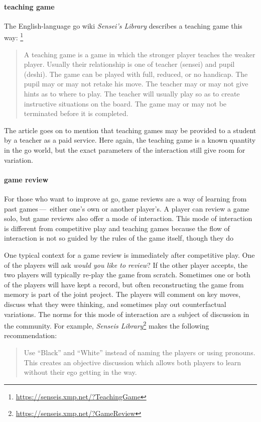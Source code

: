 \documentclass{scrartcl}
\begin{document}
\paragraph{teaching game} The English-language go wiki 
\textit{Sensei's Library}
describes a teaching game this way:%
\footnote{\url{https://senseis.xmp.net/?TeachingGame}}
\begin{quote}
  A teaching game is a game in which the stronger player teaches the weaker player. Usually their relationship is one of teacher (sensei) and pupil (deshi). The game can be played with full, reduced, or no handicap. The pupil may or may not retake his move. The teacher may or may not give hints as to where to play. The teacher will usually play so as to create instructive situations on the board. The game may or may not be terminated before it is completed. 
\end{quote}

\noindent The article goes on to mention that teaching games may
be provided to a student by a teacher as a paid service.
Here again, the teaching game is a known quantity in the go world,
but the exact parameters of the interaction still 
give room for variation. 

\paragraph{game review} For those who want to improve at go,
game reviews are a way of learning from past games\,---\,%
either one's own or another player's.
A player can review a game solo, 
but game reviews also offer a mode of interaction.
This mode of interaction is different from competitive play and
teaching games because the flow of interaction is not so guided
by the rules of the game itself, though they do 

One typical context for a game review is immediately after 
competitive play. 
One of the players will ask \textit{would you like to review}?
If the other player accepts, 
the two players will typically re-play the game from scratch.
Sometimes one or both of the players will have kept a record,
but often reconstructing the game from memory is part of the 
joint project.
The players will comment on key moves, 
discuss what they were thinking,
and sometimes play out counterfactual variations.
The norms for this mode of interaction are
a subject of discussion in the community.
For example, \textit{Senseis Library}\footnote{\url{https://senseis.xmp.net/?GameReview}}
makes the following recommendation:
\begin{quote}
   Use ``Black'' and ``White'' instead of naming the players or using pronouns. This creates an objective discussion which allows both players to learn without their ego getting in the way. 
\end{quote}
\end{document}

